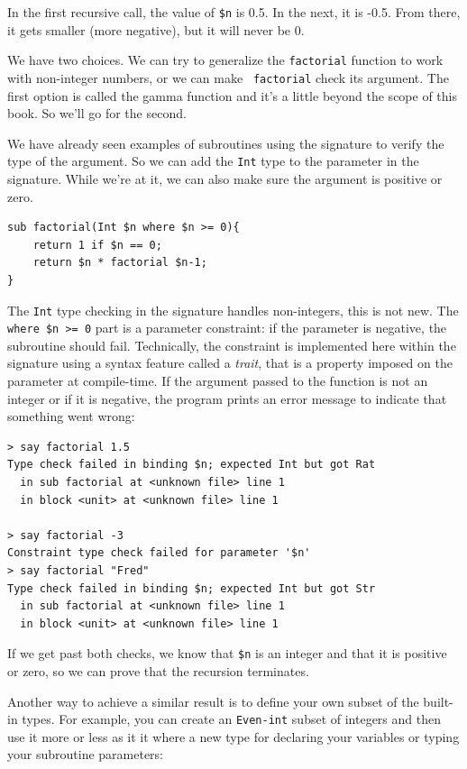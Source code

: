 In the first recursive call, the value of {\tt \$n} is 0.5.
In the next, it is -0.5.  From there, it gets smaller
(more negative), but it will never be 0.

We have two choices.  We can try to generalize the {\tt factorial}
function to work with non-integer numbers, or we can make {\tt
  factorial} check its argument.  The first option is
called the gamma function and it's a
little beyond the scope of this book.  So we'll go for the second.

We have already seen examples of subroutines using the signature 
to verify the type of the argument. So we can add the {\tt Int} 
type to the parameter in the signature. While we're at it, 
we can also make sure the argument is positive or zero.

\begin{verbatim}
sub factorial(Int $n where $n >= 0){
    return 1 if $n == 0;
    return $n * factorial $n-1;
}
\end{verbatim}
%
The {\tt Int} type checking in the signature handles 
non-integers, this is not new. The {\tt where \$n >= 0} 
part is a parameter constraint: if the parameter is negative, 
the subroutine should fail.  Technically, the constraint is 
implemented here within the signature using a syntax feature 
called a \emph{trait}, that is a property imposed on the 
parameter at compile-time. If the argument passed to the 
function is not an integer or if it is negative, the program prints
an error message to indicate that something went wrong:

\begin{verbatim}
> say factorial 1.5
Type check failed in binding $n; expected Int but got Rat
  in sub factorial at <unknown file> line 1
  in block <unit> at <unknown file> line 1

> say factorial -3
Constraint type check failed for parameter '$n'
> say factorial "Fred"
Type check failed in binding $n; expected Int but got Str
  in sub factorial at <unknown file> line 1
  in block <unit> at <unknown file> line 1
\end{verbatim}
% 
If we get past both checks, we know that \verb'$n' is an 
integer and that it is positive or zero, so we can prove 
that the recursion terminates.


Another way to achieve a similar result is to define your own 
subset of the built-in types. For example, you can create an 
{\tt Even-int} subset of integers and then use it more or less 
as it it where a new type for declaring your variables or 
typing your subroutine parameters:

